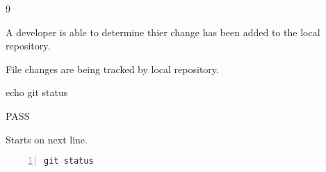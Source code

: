 \begin{description}[align=right,leftmargin=3.2cm,labelindent=3.0cm]
\item[Step:] 9
\item[Confirm:] A developer is able to determine thier change has been added to the local repository.
\item[Expectation:] File changes are being tracked by local repository.
\item[Command:] echo git  status
\item[Test Result:] PASS
\item[Evidence:] Starts on next line.
\end{description}
\begin{lstlisting}[numbers=left]
git status

\end{lstlisting}

